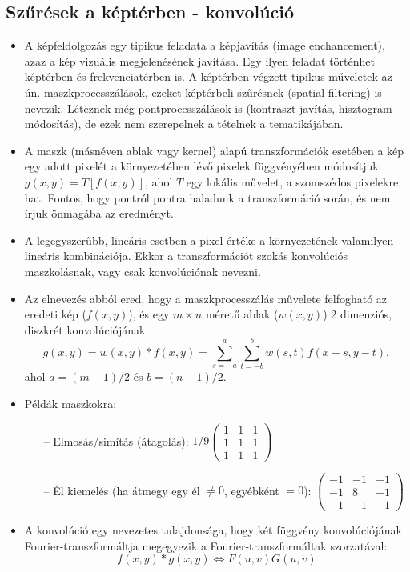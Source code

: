 \documentclass[12pt]{article}
\theoremstyle{plain}
\begin{document}
\subsection{Szűrések a képtérben - konvolúció}
\begin{itemize}
\item A képfeldolgozás egy tipikus feladata a képjavítás (image enchancement), azaz a kép vizuális megjelenésének javítása. Egy ilyen feladat történhet képtérben és frekvenciatérben is. A képtérben végzett tipikus műveletek az ún. maszkprocesszálások, ezeket képtérbeli szűrésnek (spatial filtering) is nevezik. Léteznek még pontprocesszálások is (kontraszt javítás, hisztogram módosítás), de ezek nem szerepelnek a tételnek a tematikájában.
\item A maszk (másnéven ablak vagy kernel) alapú transzformációk esetében a kép egy adott pixelét a környezetében lévő pixelek függvényében módosítjuk: $g(x,y) = T[f(x,y)]$, ahol $T$ egy lokális művelet, a szomszédos pixelekre hat. Fontos, hogy pontról pontra haladunk a transzformáció során, és nem írjuk önmagába az eredményt.
\item A legegyszerűbb, lineáris esetben a pixel értéke a környezetének valamilyen lineáris kombinációja. Ekkor a transzformációt szokás konvolúciós maszkolásnak, vagy csak konvolúciónak nevezni.
\item Az elnevezés abból ered, hogy a maszkprocesszálás művelete felfogható az eredeti kép ($f(x,y)$), és egy $m \times n$ méretű ablak ($w(x,y)$) 2 dimenziós, diszkrét konvolúciójának:
$$g(x,y) = w(x,y) * f(x,y) = \sum^a_{s = -a}\sum^b _{t=-b}w(s,t)f(x-s,y-t),$$
ahol $a = (m-1)/2$ és $b = (n-1)/2.$
\item Példák maszkokra:
\begin{itemize}
\item[--] Elmosás/simítás (átagolás): $1/9 \begin{pmatrix} 
1 & 1 & 1 \\
1&1 & 1 \\
1 & 1 & 1
\end{pmatrix}$
\item[--] Él kiemelés (ha átmegy egy él $\neq 0$, egyébként $=0$): $\begin{pmatrix} 
-1 & -1 & -1 \\
-1&8 & -1 \\
-1 & -1 & -1
\end{pmatrix}$
\end{itemize}{}
\item A konvolúció egy nevezetes tulajdonsága, hogy két függvény konvolúciójának Fourier-transzformáltja megegyezik a Fourier-transzformáltak szorzatával:
$$f(x,y) * g(x,y) \Longleftrightarrow F(u,v)G(u,v)$$
\end{itemize}{}
\end{document}
